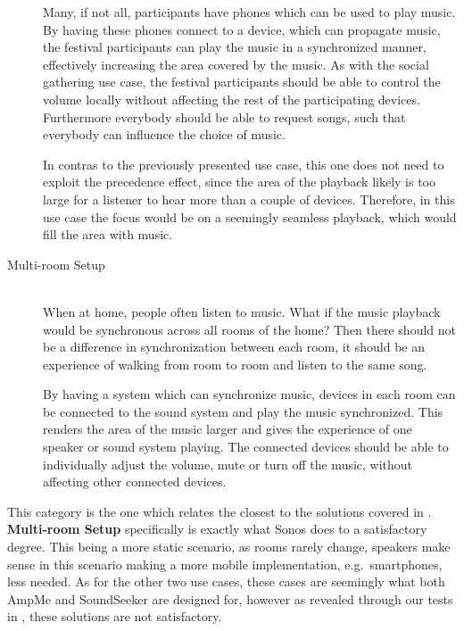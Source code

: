 \begin{description}
        Many, if not all, participants have phones which can be used to play music.
        By having these phones connect to a device, which can propagate music,
        the festival participants can play the music in a synchronized manner,
        effectively increasing the area covered by the music.
        As with the social gathering use case,
        the festival participants should be able to control the volume locally without affecting the rest of the participating devices.
        Furthermore everybody should be able to request songs, such that everybody can influence the choice of music.

        In contras to the previously presented use case, this one does not need to exploit the precedence effect, since the area of the playback likely is too large for a listener to hear more than a couple of devices.
        Therefore, in this use case the focus would be on a seemingly seamless playback, which would fill the area with music.

    \item[Multi-room Setup] \hfill\\
        When at home, people often listen to music.
        What if the music playback would be synchronous across all rooms of the home?
        Then there should not be a difference in synchronization between each room,
        it should be an experience of walking from room to room and listen to the same song.

        By having a system which can synchronize music, devices in each room can be connected to the sound system and play the music synchronized.
        This renders the area of the music larger and gives the experience of one speaker or sound system playing.
        The connected devices should be able to individually adjust the volume, mute or turn off the music,
        without affecting other connected devices.
\end{description}

This category is the one which relates the closest to the solutions covered in .
\textbf{Multi-room Setup} specifically is exactly what Sonos does to a satisfactory degree.
This being a more static scenario, as rooms rarely change, speakers make sense in this scenario making a more mobile implementation, e.g.\ smartphones, less needed.
As for the other two use cases, these cases are seemingly what both AmpMe and SoundSeeker are designed for, however as revealed through our tests in , these solutions are not satisfactory.
